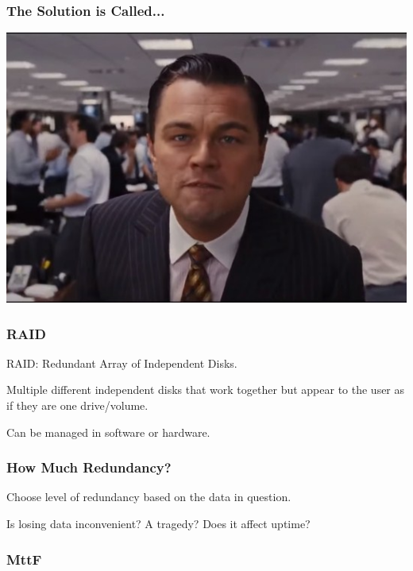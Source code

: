 \begin{frame}
\frametitle{The Solution is Called...}

\begin{center}
	\includegraphics[width=\textwidth]{images/leo.jpg}
\end{center}

\end{frame}


\begin{frame}
\frametitle{RAID}

RAID: Redundant Array of Independent Disks.


Multiple different independent disks that work together but appear to the user as if they are one drive/volume.

Can be managed in software or hardware.

\end{frame}


\begin{frame}
\frametitle{How Much Redundancy?}

Choose level of redundancy based on the data in question.

Is losing data inconvenient? A tragedy? Does it affect uptime?

\end{frame}


\begin{frame}
\frametitle{MttF}



\end{frame}








